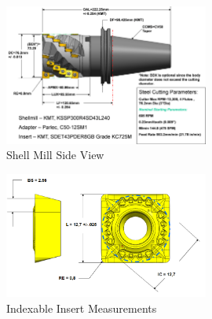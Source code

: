 \begin{figure}[ht]
  \centering
  \includegraphics[width=0.6\textwidth]{figures/a7-shell-mill-side-view.png}
  \caption{Shell Mill Side View}
  \label{fig:a7-shell-mill-side-view}
\end{figure}
\FloatBarrier

\begin{figure}[ht]
  \centering
  \includegraphics[width=0.6\textwidth]{figures/a8-indexable-insert-measurements.png}
  \caption{Indexable Insert Measurements}
  \label{fig:a8-indexable-insert-measurements}
\end{figure}
\FloatBarrier


